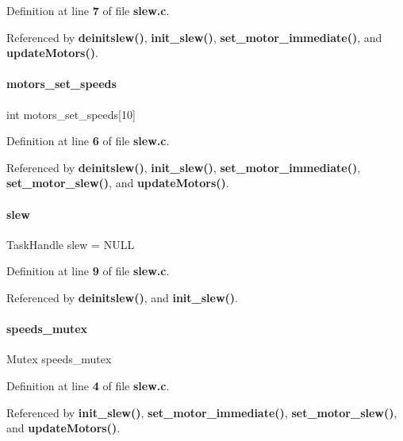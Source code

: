 Definition at line \textbf{ 7} of file \textbf{ slew.\+c}.



Referenced by \textbf{ deinitslew()}, \textbf{ init\+\_\+slew()}, \textbf{ set\+\_\+motor\+\_\+immediate()}, and \textbf{ update\+Motors()}.

\mbox{\label{slew_8c_acf7558ed17fdecd298ea7eb82291c7d0}} 
\paragraph{motors\+\_\+set\+\_\+speeds}
{\footnotesize\ttfamily int motors\+\_\+set\+\_\+speeds[10]\hspace{0.3cm}{\ttfamily [static]}}



Definition at line \textbf{ 6} of file \textbf{ slew.\+c}.



Referenced by \textbf{ deinitslew()}, \textbf{ init\+\_\+slew()}, \textbf{ set\+\_\+motor\+\_\+immediate()}, \textbf{ set\+\_\+motor\+\_\+slew()}, and \textbf{ update\+Motors()}.

\mbox{\label{slew_8c_a9dc30877eadbb32ceb6bede027c9a93f}} 
\paragraph{slew}
{\footnotesize\ttfamily Task\+Handle slew = N\+U\+LL\hspace{0.3cm}{\ttfamily [static]}}



Definition at line \textbf{ 9} of file \textbf{ slew.\+c}.



Referenced by \textbf{ deinitslew()}, and \textbf{ init\+\_\+slew()}.

\mbox{\label{slew_8c_a29ddd4c66a52ff81b441d04f9f6d9318}} 
\paragraph{speeds\+\_\+mutex}
{\footnotesize\ttfamily Mutex speeds\+\_\+mutex\hspace{0.3cm}{\ttfamily [static]}}



Definition at line \textbf{ 4} of file \textbf{ slew.\+c}.



Referenced by \textbf{ init\+\_\+slew()}, \textbf{ set\+\_\+motor\+\_\+immediate()}, \textbf{ set\+\_\+motor\+\_\+slew()}, and \textbf{ update\+Motors()}.


